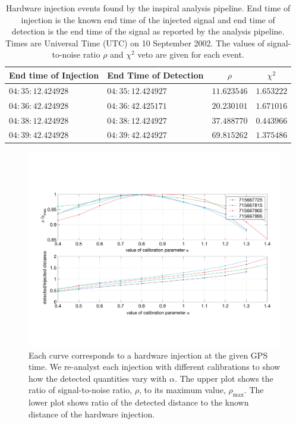 \begin{table}[p]
  \begin{flushright}
  \begin{tabular}{l|l|c|c}
  End time of Injection&End Time of Detection&$\rho$&$\chi^2$\\
  \hline
  $04:35:12.424928$ & $04:35:12.424927$ & $11.623546$ & $1.653222$ \\
  $04:36:42.424928$ & $04:36:42.425171$ & $20.230101$ & $1.671016$ \\
  $04:38:12.424928$ & $04:38:12.424927$ & $37.488770$ & $0.443966$ \\
  $04:39:42.424928$ & $04:39:42.424927$ & $69.815262$ & $1.375486$ \\
  \end{tabular}
  \end{flushright}
  \caption{%
  Hardware injection events found by the inspiral analysis pipeline. End time
  of injection is the known end time of the injected signal and end time of
  detection is the end time of the signal as reported by the analysis
  pipeline. Times are Universal Time (UTC) on 10 September 2002. The values of
  signal-to-noise ratio $\rho$ and $\chi^2$ veto are given for each event.
  }
\label{t:triggers}
\end{table}

\begin{figure}[p]
  \vspace{5pt}
  \begin{flushright}
    \includegraphics[width=\textwidth]{figures/hardware/calibration}    
  \end{flushright}
  \caption{%
  Each curve corresponds to a hardware injection at the given GPS time. We
  re-analyst each injection with different calibrations to show how the
  detected quantities vary with $\alpha$. The upper plot shows the ratio of
  signal-to-noise ratio, $\rho$, to its maximum value, $\rho_{\mathrm{max}}$.
  The lower plot shows ratio of the detected distance to the known distance of
  the hardware injection.
  }
\label{f:calibration}
\end{figure}

